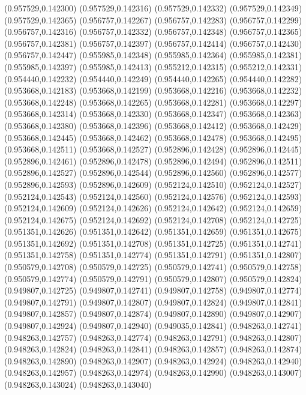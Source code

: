 (0.957529,0.142300)
(0.957529,0.142316)
(0.957529,0.142332)
(0.957529,0.142349)
(0.957529,0.142365)
(0.956757,0.142267)
(0.956757,0.142283)
(0.956757,0.142299)
(0.956757,0.142316)
(0.956757,0.142332)
(0.956757,0.142348)
(0.956757,0.142365)
(0.956757,0.142381)
(0.956757,0.142397)
(0.956757,0.142414)
(0.956757,0.142430)
(0.956757,0.142447)
(0.955985,0.142348)
(0.955985,0.142364)
(0.955985,0.142381)
(0.955985,0.142397)
(0.955985,0.142413)
(0.955212,0.142315)
(0.955212,0.142331)
(0.954440,0.142232)
(0.954440,0.142249)
(0.954440,0.142265)
(0.954440,0.142282)
(0.953668,0.142183)
(0.953668,0.142199)
(0.953668,0.142216)
(0.953668,0.142232)
(0.953668,0.142248)
(0.953668,0.142265)
(0.953668,0.142281)
(0.953668,0.142297)
(0.953668,0.142314)
(0.953668,0.142330)
(0.953668,0.142347)
(0.953668,0.142363)
(0.953668,0.142380)
(0.953668,0.142396)
(0.953668,0.142412)
(0.953668,0.142429)
(0.953668,0.142445)
(0.953668,0.142462)
(0.953668,0.142478)
(0.953668,0.142495)
(0.953668,0.142511)
(0.953668,0.142527)
(0.952896,0.142428)
(0.952896,0.142445)
(0.952896,0.142461)
(0.952896,0.142478)
(0.952896,0.142494)
(0.952896,0.142511)
(0.952896,0.142527)
(0.952896,0.142544)
(0.952896,0.142560)
(0.952896,0.142577)
(0.952896,0.142593)
(0.952896,0.142609)
(0.952124,0.142510)
(0.952124,0.142527)
(0.952124,0.142543)
(0.952124,0.142560)
(0.952124,0.142576)
(0.952124,0.142593)
(0.952124,0.142609)
(0.952124,0.142626)
(0.952124,0.142642)
(0.952124,0.142659)
(0.952124,0.142675)
(0.952124,0.142692)
(0.952124,0.142708)
(0.952124,0.142725)
(0.951351,0.142626)
(0.951351,0.142642)
(0.951351,0.142659)
(0.951351,0.142675)
(0.951351,0.142692)
(0.951351,0.142708)
(0.951351,0.142725)
(0.951351,0.142741)
(0.951351,0.142758)
(0.951351,0.142774)
(0.951351,0.142791)
(0.951351,0.142807)
(0.950579,0.142708)
(0.950579,0.142725)
(0.950579,0.142741)
(0.950579,0.142758)
(0.950579,0.142774)
(0.950579,0.142791)
(0.950579,0.142807)
(0.950579,0.142824)
(0.949807,0.142725)
(0.949807,0.142741)
(0.949807,0.142758)
(0.949807,0.142774)
(0.949807,0.142791)
(0.949807,0.142807)
(0.949807,0.142824)
(0.949807,0.142841)
(0.949807,0.142857)
(0.949807,0.142874)
(0.949807,0.142890)
(0.949807,0.142907)
(0.949807,0.142924)
(0.949807,0.142940)
(0.949035,0.142841)
(0.948263,0.142741)
(0.948263,0.142757)
(0.948263,0.142774)
(0.948263,0.142791)
(0.948263,0.142807)
(0.948263,0.142824)
(0.948263,0.142841)
(0.948263,0.142857)
(0.948263,0.142874)
(0.948263,0.142890)
(0.948263,0.142907)
(0.948263,0.142924)
(0.948263,0.142940)
(0.948263,0.142957)
(0.948263,0.142974)
(0.948263,0.142990)
(0.948263,0.143007)
(0.948263,0.143024)
(0.948263,0.143040)
